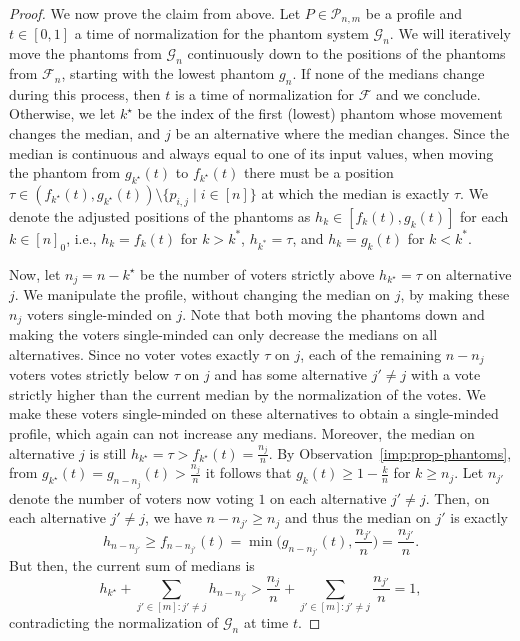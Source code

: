 \documentclass[11pt]{article}
\newcommand{\F}{\mathcal{F}}
\newcommand{\G}{\mathcal{G}}
\begin{document}
\begin{proof}
    We now prove the claim from above. Let $P\in \mathcal{P}_{n,m}$ be a profile and $t\in [0,1]$ a time of normalization for the phantom system $\G_n$. %
    We will iteratively move the phantoms from $\G_n$ continuously down to the positions of the phantoms from $\F_n$, starting with the lowest phantom $g_n$. 
    If none of the medians change during this process, then $t$ is a time of normalization for $\F$ and we conclude. 
    Otherwise, we let $k^\star$ be the index of the first (lowest) phantom whose movement changes the median, and $j$ be an alternative where the median changes. 
    Since the median is continuous and always equal to one of its input values, when moving the phantom from $g_{k^\star}(t)$ to $f_{k^\star}(t)$ there must be a position $\tau \in (f_{k^\star}(t), g_{k^\star}(t)) \setminus \{p_{i,j} \mid i \in [n]\}$ at which the median is exactly $\tau$. We denote the adjusted positions of the phantoms as $h_k \in [f_k(t), g_k(t)]$ for each $k \in [n]_0$, i.e., $h_k=f_k(t)$ for $k>k^*$, $h_{k^*}=\tau$, and $h_k=g_k(t)$ for $k<k^*$.

    Now, let $n_j = n-k^\star$ be the number of voters strictly above $h_{k^\star} = \tau$ on alternative $j$. We manipulate the profile, without changing the median on $j$, by making these $n_j$ voters single-minded on $j$. Note that both moving the phantoms down and making the voters single-minded can only decrease the medians on all alternatives. Since no voter votes exactly $\tau$ on $j$, each of the remaining $n-n_j$ voters votes strictly below $\tau$ on $j$ and has some alternative $j' \neq j$ with a vote strictly higher than the current median by the normalization of the votes. %
    We make these voters single-minded on these alternatives to obtain a single-minded profile, which again can not increase any medians. Moreover, the median on alternative $j$ is still $h_{k^\star} = \tau > f_{k^\star}(t) = \frac{n_j}{n}$. By Observation~\eqref{imp:prop-phantoms}, from $g_{k^\star}(t) = g_{n-n_j}(t) > \frac{n_j}{n}$ it follows that $g_k(t) \ge 1 - \frac{k}{n}$ for $k \ge n_j$. Let $n_{j'}$ denote the number of voters now voting $1$ on each alternative $j' \neq j$. Then, on each alternative $j' \neq j$, we have $n-n_{j'} \ge n_j$ and thus the median on $j'$ is exactly $$h_{n-n_{j'}} \ge f_{n-n_{j'}}(t) = \min\bigg(g_{n-n_{j'}}(t), \frac{n_{j'}}{n}\bigg) = \frac{n_{j'}}{n}.$$ But then, the current sum of medians is $$h_{k^\star} + \sum_{j' \in [m]: j' \neq j}  h_{n-n_{j'}} > \frac{n_j}{n} + \sum_{j' \in [m]:j' \neq j} \frac{n_{j'}}{n} = 1,$$ contradicting the normalization of $\mathcal{G}_n$ at time $t$.
\end{proof}
\end{document}

